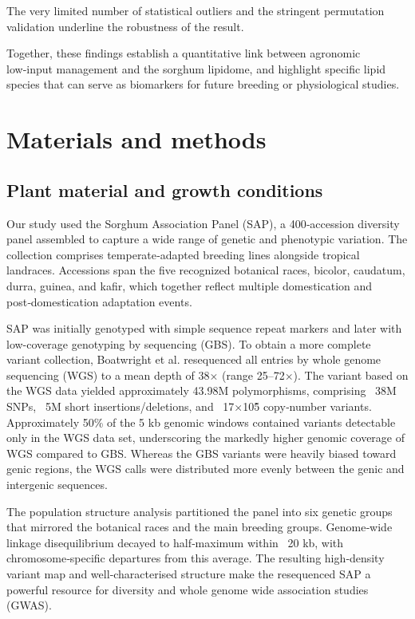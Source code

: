 \documentclass[10pt,letterpaper]{article}
\begin{document}
The very limited number of statistical outliers and the stringent permutation validation underline the robustness of the result.

Together, these findings establish a quantitative link between agronomic low‑input management and the sorghum lipidome, and highlight specific lipid species that can serve as biomarkers for future breeding or physiological studies.

\section*{Materials and methods}

\subsection*{Plant material and growth conditions}
Our study used the Sorghum Association Panel (SAP), a 400‑accession diversity panel assembled to capture a wide range of genetic and phenotypic variation. The collection comprises temperate‑adapted breeding lines alongside tropical landraces. Accessions span the five recognized botanical races, bicolor, caudatum, durra, guinea, and kafir, which together reflect multiple domestication and post‑domestication adaptation events.

 SAP was initially genotyped with simple sequence repeat markers and later with low-coverage genotyping by sequencing (GBS). To obtain a more complete variant collection, Boatwright et al. resequenced all entries by whole genome sequencing (WGS) to a mean depth of 38× (range 25–72×). The variant based on the WGS data yielded approximately 43.98M polymorphisms, comprising ~38M SNPs, ~5M short insertions/deletions, and ~17×10\^5 copy‑number variants. Approximately 50\% of the 5 kb genomic windows contained variants detectable only in the WGS data set, underscoring the markedly higher genomic coverage of WGS compared to GBS. Whereas the GBS variants were heavily biased toward genic regions, the WGS calls were distributed more evenly between the genic and intergenic sequences.

The population structure analysis partitioned the panel into six genetic groups that mirrored the botanical races and the main breeding groups. Genome‑wide linkage disequilibrium decayed to half‑maximum within ~20 kb, with chromosome‑specific departures from this average. The resulting high‑density variant map and well‑characterised structure make the resequenced SAP a powerful resource for diversity and whole genome wide association studies (GWAS).
\end{document}
